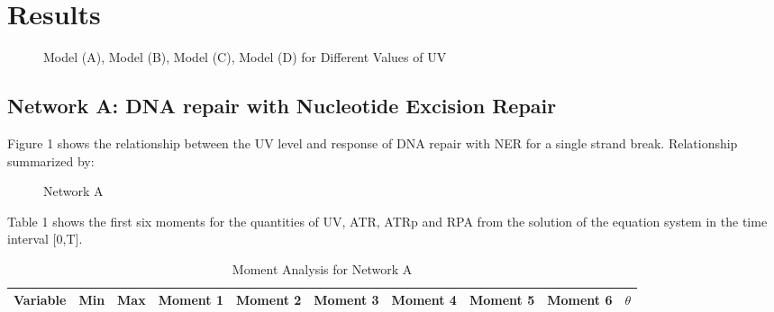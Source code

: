 \documentclass[preprint, 8pt]{elsarticle}
\theoremstyle{definition}
\begin{document}
\section{Results}

\vspace{6pt}
\begin{figure}[H]
	\centering
	\begin{minipage}[b]{0.5\linewidth}
            \label{fig:networkA}
	\end{minipage}\hfill
	\begin{minipage}[b]{0.5\linewidth}
            \label{fig:networkB}
	\end{minipage}\hfill
	\begin{minipage}[b]{0.5\linewidth}
            \label{fig:networkC}
	\end{minipage}\hfill
	\begin{minipage}[b]{0.5\linewidth}
            \label{fig:networkD}
	\end{minipage}\hfill
	\caption{Model (A), Model (B), Model (C), Model (D) for Different Values of UV}
	\label{fig:Figure1}
\end{figure}


\subsection{Network A: DNA repair with Nucleotide Excision Repair}
\raggedright
Figure 1 shows the relationship between the UV level and response of DNA repair with NER for a single strand break.  Relationship summarized by:

\begin{enumerate}
\end{enumerate}

\vspace{6pt}
\begin{figure}[H]
	\centering
	\caption{Network A}
	\label{fig:Figure1}
\end{figure}

Table 1 shows the first six moments for the quantities of UV, ATR, ATRp and RPA from the solution of the equation system in the time interval [0,T].
\centering
\begin{table}[H]\tiny
 \caption{Moment Analysis for Network A}
\begin{tabular}{rp{.3cm}p{.3cm}p{.25cm}p{.25cm}p{.25cm}p{.25cm}p{.25cm}p{.25cm}p{.25cm}}
	\hline
	Variable &Min & Max & Moment 1 & Moment 2 & Moment 3 & Moment 4 & Moment 5 & Moment 6 &  $\theta$\\ 
	\hline
	\hline
	\end{tabular}
\end{table}
\raggedright
\end{document}
